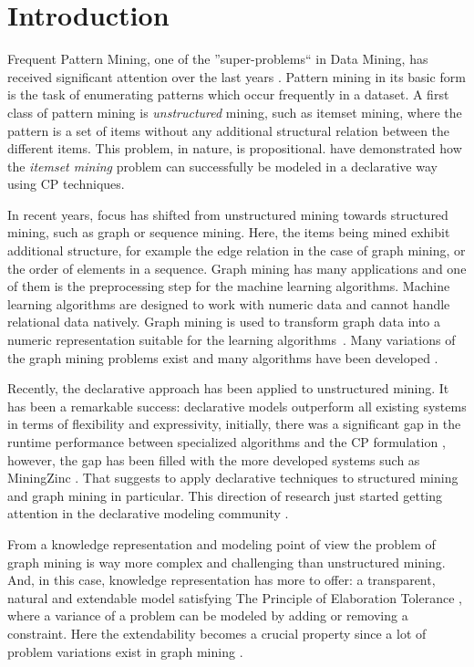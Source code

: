 \section{Introduction}
Frequent Pattern Mining, one of the ''super-problems`` in Data Mining, has received significant attention over the last years \citep{pattern_mining_book}. Pattern mining in its basic form is the task of enumerating patterns which occur frequently in a dataset.
A first class of pattern mining is \emph{unstructured} mining, such as itemset mining, where the pattern is a set of items without any additional structural relation between the different items.
This problem, in nature, is propositional.
\citet{tias_original} have demonstrated how the \emph{itemset mining} problem can successfully be modeled in a declarative way using CP techniques.

In recent years, focus has shifted from unstructured mining towards structured mining, such as graph or sequence mining.
Here, the items being mined exhibit additional structure, for example the edge relation in the case of graph mining, or the order of elements in a sequence. Graph mining has many applications and one of them is the preprocessing step for the machine learning algorithms. Machine learning algorithms are designed to work with numeric data and cannot handle relational data natively. Graph mining is used to transform graph data into a numeric representation suitable for the learning algorithms~\citep{pattern_mining_classification}. Many variations of the graph mining problems exist \citep{subtree_overview} and many algorithms have been developed \citep{gspan,theta_subsumption}.

Recently, the declarative approach has been applied to unstructured mining. It has been a remarkable success: declarative models outperform all existing systems in terms of flexibility and expressivity, initially, there was a significant gap in the runtime performance between specialized algorithms and the CP formulation \citep{tias_original,mining_cp_extra}, however, the gap has been filled with the more developed systems such as MiningZinc \citep{tias_declarative_pattern_mining}. That suggests to apply declarative techniques to structured mining and graph mining in particular. This direction of research just started getting attention in the declarative modeling community \citep{cp_sequence_mining,ilp_graph_mining}. 

From a knowledge representation and modeling point of view the problem of graph mining is way more complex and challenging than unstructured mining. And, in this case, knowledge representation has more to offer: a transparent, natural and extendable model satisfying The Principle of Elaboration Tolerance \citep{elaboration_tolerance}, where a variance of a problem can be modeled by adding or removing a constraint. Here the extendability becomes a crucial property since a lot of problem variations exist in graph mining \citep{gspan,theta_subsumption,subtree_overview}.

